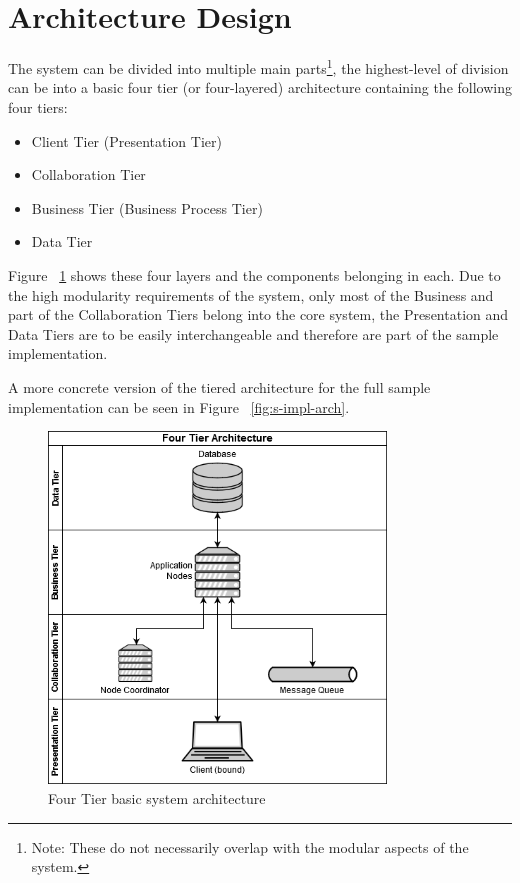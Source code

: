 \section{Architecture Design}
The system can be divided into multiple main parts\footnote{Note: These do not necessarily overlap with the modular aspects of the system.}, the highest-level of division can be into a basic four tier (or four-layered) architecture containing the following four tiers:
\begin{itemize}
\item Client Tier (Presentation Tier)
\item Collaboration Tier
\item Business Tier (Business Process Tier)
\item Data Tier
\end{itemize}

Figure ~\ref{fig:layer-arch} shows these four layers and the components belonging in each. Due to the high modularity requirements of the system, only most of the Business and part of the Collaboration Tiers belong into the core system, the Presentation and Data Tiers are to be easily interchangeable and therefore are part of the sample implementation.

A more concrete version of the tiered architecture for the full sample implementation can be seen in Figure ~\ref{fig:s-impl-arch}.

\begin{figure}[!ht]
	\centering
	\includegraphics[width=0.8\textwidth]{figures/03_design/layer-arch}
    \caption{Four Tier basic system architecture}
    \label{fig:layer-arch}
\end{figure}

